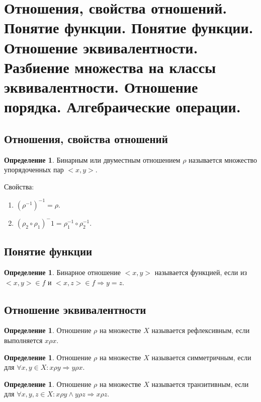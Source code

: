 \documentclass[12pt]{report}
\theoremstyle{definition}
\newtheorem{definition}[theorem]{Определение}
\begin{document}
\section
{
  Отношения, свойства отношений. Понятие функции.
  Понятие функции. Отношение эквивалентности.
  Разбиение множества на классы эквивалентности.
  Отношение порядка. Алгебраические операции.
}

\subsection{Отношения, свойства отношений}

\begin{definition}
Бинарным или двуместным отношением $\rho$ называется множество
упорядоченных пар $<x, y>$.
\end{definition}

Свойства:
\begin{enumerate}
\item $(\rho^{-1})^{-1} = \rho$.
\item $(\rho_2 \circ \rho_1)^-1 = \rho_1^{-1} \circ \rho_2^{-1}$.
\end{enumerate}

\subsection{Понятие функции}
\begin{definition}
Бинарное отношение $<x, y>$ называется функцией, если из
$<x, y> \in f$ и $<x, z> \in f \Rightarrow y = z$.
\end{definition}

\subsection{Отношение эквивалентности}
\begin{definition}
Отношение $\rho$ на множестве $X$ называется рефлексивным,
если выполняется $x \rho x$.
\end{definition}

\begin{definition}
Отношение $\rho$ на множестве $X$ называется симметричным,
если для $\forall x, y \in X: x \rho y \Rightarrow y \rho x$.
\end{definition}

\begin{definition}
Отношение $\rho$ на множестве $X$ называется транзитивным,
если для $\forall x, y, z \in X: x \rho y \land y \rho z \Rightarrow x \rho z$.
\end{definition}
\end{document}
